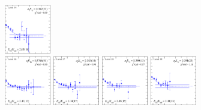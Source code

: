 \begin{figure}[H]
    \includegraphics[width=0.18\textwidth]{figures/sigmas/hu/fits/fit_21.pdf}\\
    \includegraphics[width=0.18\textwidth]{figures/sigmas/hu/fits/fit_10.pdf}
    \includegraphics[width=0.18\textwidth]{figures/sigmas/hu/fits/fit_15.pdf}
    \includegraphics[width=0.18\textwidth]{figures/sigmas/hu/fits/fit_18.pdf}
    \includegraphics[width=0.18\textwidth]{figures/sigmas/hu/fits/fit_22.pdf}\\

\end{figure}
